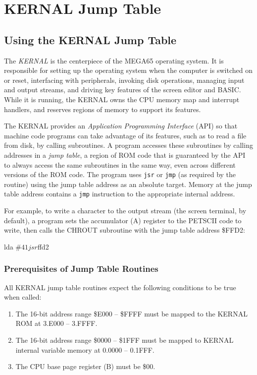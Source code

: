 \chapter{KERNAL Jump Table}
\label{cha:kernal-jump-table}

\section{Using the KERNAL Jump Table}

The \emph{KERNAL} is the centerpiece of the MEGA65 operating system. It is responsible for setting up the operating system when the computer is switched on or reset, interfacing with peripherals, invoking disk operations, managing input and output streams, and driving key features of the screen editor and BASIC. While it is running, the KERNAL owns the CPU memory map and interrupt handlers, and reserves regions of memory to support its features.

The KERNAL provides an \emph{Application Programming Interface} (API) so that machine code programs can take advantage of its features, such as to read a file from disk, by calling subroutines. A program accesses these subroutines by calling addresses in a \emph{jump table}, a region of ROM code that is guaranteed by the API to always access the same subroutines in the same way, even across different versions of the ROM code. The program uses \texttt{jsr} or \texttt{jmp} (as required by the routine) using the jump table address as an absolute target. Memory at the jump table address contains a \texttt{jmp} instruction to the appropriate internal address.

For example, to write a character to the output stream (the screen terminal, by default), a program sets the accumulator (A) register to the PETSCII code to write, then calls the CHROUT subroutine with the jump table address \$FFD2:

\begin{asmcode}
    lda #$41
    jsr $ffd2
\end{asmcode}

\subsection{Prerequisites of Jump Table Routines}

All KERNAL jump table routines expect the following conditions to be true when called:

\begin{enumerate}
\item The 16-bit address range \$E000 -- \$FFFF must be mapped to the KERNAL ROM at 3.E000 -- 3.FFFF.
\item The 16-bit address range \$0000 -- \$1FFF must be mapped to KERNAL internal variable memory at 0.0000 -- 0.1FFF.
\item The CPU base page register (B) must be \$00.
\end{enumerate}

